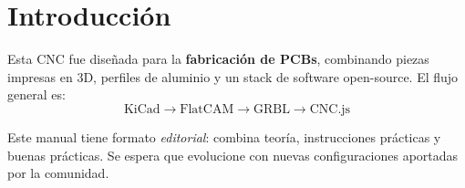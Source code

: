 \chapter{Introducción}
\label{ch:intro}
Esta CNC fue diseñada para la \textbf{fabricación de PCBs}, combinando piezas impresas en 3D, perfiles de aluminio y un stack de software open-source.  
El flujo general es:
\[
\text{KiCad} \rightarrow \text{FlatCAM} \rightarrow \text{GRBL} \rightarrow \text{CNC.js}
\]

\begin{notebox}
Este manual tiene formato \textit{editorial}: combina teoría, instrucciones prácticas y buenas prácticas. Se espera que evolucione con nuevas configuraciones aportadas por la comunidad.
\end{notebox}

